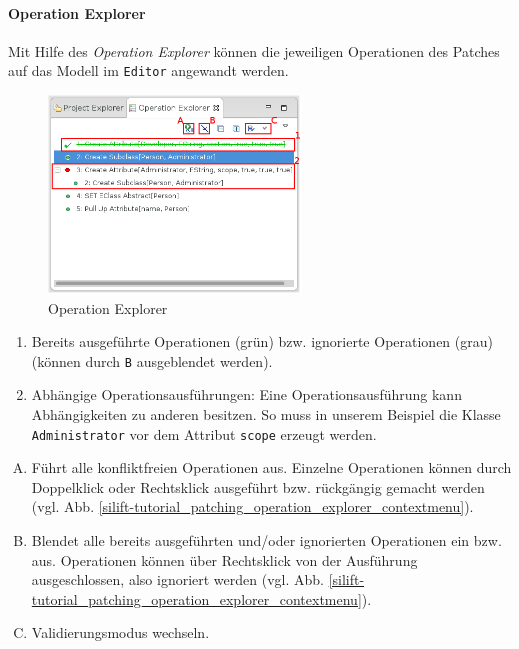 \paragraph{Operation Explorer}

Mit Hilfe des \textit{Operation Explorer} können die jeweiligen Operationen des Patches auf das Modell im \texttt{Editor} angewandt werden.

\begin{figure}[H]
\centering
\includegraphics[width=0.6\textwidth]{patching/graphics/silift-tutorial_patching_operation_explorer.png}
\caption{Operation Explorer}
\label{silift-tutorial_patching_operation_explorer}
\end{figure}

\begin{enumerate}
	\item Bereits ausgeführte Operationen (grün) bzw. ignorierte Operationen (grau) (können durch \texttt{B} ausgeblendet werden).
	\item Abhängige Operationsausführungen: Eine Operationsausführung kann Abhängigkeiten zu anderen besitzen. So muss in unserem Beispiel die Klasse \texttt{Administrator} vor dem Attribut \texttt{scope} erzeugt werden.
\end{enumerate}

\begin{enumerate}[(A)]
	\item Führt alle konfliktfreien Operationen aus. Einzelne Operationen können durch Doppelklick oder Rechtsklick ausgeführt bzw. rückgängig gemacht werden (vgl. Abb. \ref{silift-tutorial_patching_operation_explorer_contextmenu}).
	\item Blendet alle bereits ausgeführten und/oder ignorierten Operationen ein bzw. aus. Operationen können über Rechtsklick von der Ausführung ausgeschlossen, also ignoriert werden (vgl. Abb. \ref{silift-tutorial_patching_operation_explorer_contextmenu}).
	\item Validierungsmodus wechseln.
\end{enumerate}

